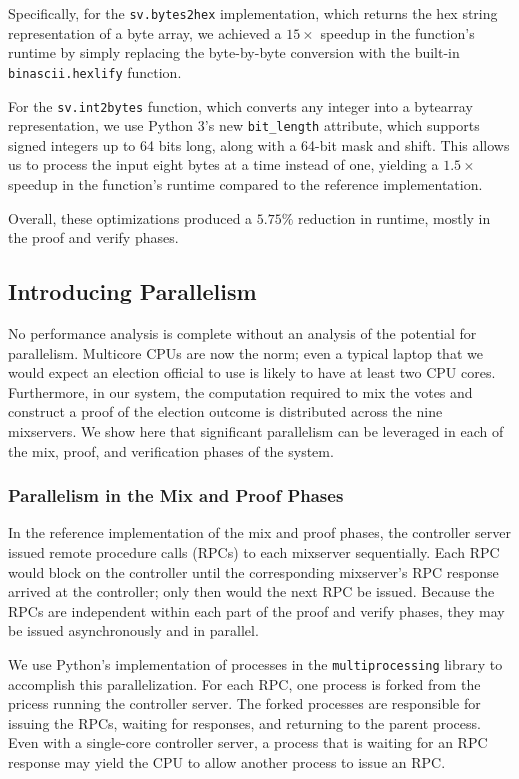 Specifically, for the \texttt{sv.bytes2hex} implementation, which returns the hex string representation of a byte array, we achieved a $15 \times$ speedup in the function's runtime by simply replacing the byte-by-byte conversion with the built-in \texttt{binascii.hexlify} function.

For the \texttt{sv.int2bytes} function, which converts any integer into a bytearray representation, we use Python 3's new \texttt{bit\_length} attribute, which supports signed integers up to 64 bits long, along with a 64-bit mask and shift. This allows us to process the input eight bytes at a time instead of one, yielding a $1.5 \times$ speedup in the function's runtime compared to the reference implementation.

Overall, these optimizations produced a $5.75\%$ reduction in runtime, mostly in the proof and verify phases.

\subsection{Introducing Parallelism} \label{perf:optimizations:parallel}

No performance analysis is complete without an analysis of the potential for parallelism. Multicore CPUs are now the norm; even a typical laptop that we would expect an election official to use is likely to have at least two CPU cores. Furthermore, in our system, the computation required to mix the votes and construct a proof of the election outcome is distributed across the nine mixservers. We show here that significant parallelism can be leveraged in each of the mix, proof, and verification phases of the system.

\subsubsection{Parallelism in the Mix and Proof Phases}

In the reference implementation of the mix and proof phases, the controller server issued remote procedure calls (RPCs) to each mixserver sequentially. Each RPC would block on the controller until the corresponding mixserver's RPC response arrived at the controller; only then would the next RPC be issued. Because the RPCs are independent within each part of the proof and verify phases, they may be issued asynchronously and in parallel.

We use Python's implementation of processes in the \texttt{multiprocessing} library to accomplish this parallelization. For each RPC, one process is forked from the pricess running the controller server. The forked processes are responsible for issuing the RPCs, waiting for responses, and returning to the parent process. Even with a single-core controller server, a process that is waiting for an RPC response may yield the CPU to allow another process to issue an RPC.

